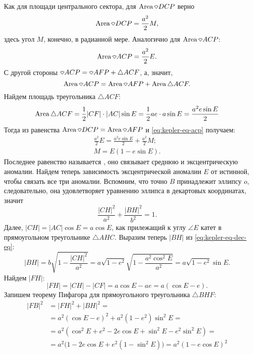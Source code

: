 Как для площади центрального сектора, для $\area \sector DCP$ верно
\begin{equation*}
	\area \sector DCP = \frac{a^2}{2} M,
\end{equation*}
здесь угол $M$, конечно, в радианной мере. Аналогично для $\area \sector ACP$:
\begin{equation*}
	\area \sector ACP = \frac{a^2}{2} E.
\end{equation*}
С другой стороны $\sector ACP = \sector AFP + \triangle ACF$, а, значит,
\begin{equation}
	\area \sector ACP = \area\sector AFP + \area\triangle ACF.
	\label{eq:kepler-eq-acp}
\end{equation}
Найдем площадь треугольника $\triangle ACF$:
\begin{equation*}
	\operatorname{Area} \triangle ACF = \frac{1}{2} |CF| \cdot |AC| \sin E = \frac{1}{2} a e \cdot a \sin E =  \frac{a^2 e\sin E}{2}
\end{equation*}
Тогда из равенства $\area \sector DCP = \area \sector AFP$ и \eqref{eq:kepler-eq-acp} получаем:
\begin{gather*}
	\frac{a^2}{2} E = \frac{a^2 e\sin E}{2} + \frac{a^2}{2} M;\\[0.5pc]
	M = E ( 1 - e \sin E).
\end{gather*}
Последнее равенство называется , оно связывает среднюю и эксцентрическую аномалии.
Найдем теперь зависимость эксцентрической аномалии $E$ от истинной, чтобы связать все три аномалии. Вспомним, что точно $B$ принадлежит эллипсу $o$, следовательно, она удовлетворяет уравнению эллипса в декартовых координатах, значит
\begin{equation}
	\frac{|CH|^2}{a^2} + \frac{|BH|^2}{b^2} = 1.
	\label{eq:kepler-eq-dec-eq}
\end{equation}
Далее, $|CH| = |AC| \cos E = a \cos E$, как прилежащий к углу $\angle E$ катет в прямоугольном треугольнике $\triangle AHC$. Выразим теперь $|BH|$ из \eqref{eq:kepler-eq-dec-eq}:
\begin{equation*}
	|BH| = b\sqrt{1 - \frac{|CH|^2}{a^2}} = a \sqrt{1 - e^2} \sqrt{1 - \frac{a^2 \cos^2 E}{a^2}} = a \sqrt{1 - e^2} \sin E .
\end{equation*}
Найдем $|FH|$:
\begin{equation*}
	|FH| = |CH| - |CF| = a \cos E - a e = a (\cos E - e).
\end{equation*}
Запишем теорему Пифагора для прямоугольного треугольника $\triangle BHF$:
\begin{align*}
	|FB|^2 &= |FH|^2 + |BH|^2 = \\
	&= a^2 (\cos E - e)^2 + a^2 \left( 1 - e^2 \right) \sin^2 E = \\
	&= a^2 \left( \cos^2 E + e^2 - 2 e \cos E + \sin^2 E - e^2 \sin^2 E \right) = \\
	&= a^2 \Big( 1 - 2 e \cos E + e^2 \left( 1 - \sin^2 E \right) \Big) =  a^2 \left( 1 - e \cos E \right)^2
\end{align*}
